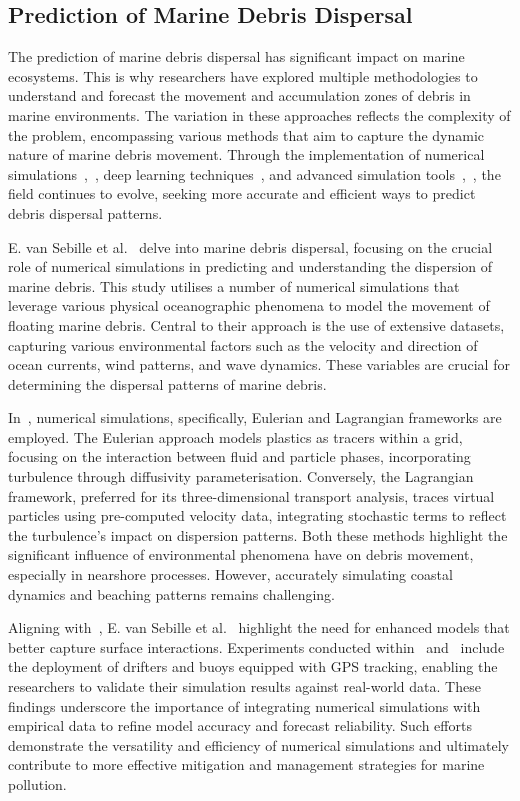 \subsection{Prediction of Marine Debris Dispersal}
\label{subsec:2.2.1}
The prediction of marine debris dispersal has significant impact on marine ecosystems. This is why researchers have explored multiple methodologies to understand and forecast the movement and accumulation zones of debris in marine environments. The variation in these approaches reflects the complexity of the problem, encompassing various methods that aim to capture the dynamic nature of marine debris movement. Through the implementation of numerical simulations~\cite{34},~\cite{35}, deep learning techniques~\cite{36}, and advanced simulation tools~\cite{37},~\cite{38}, the field continues to evolve, seeking more accurate and efficient ways to predict debris dispersal patterns. 

E. van Sebille et al.~\cite{34} delve into marine debris dispersal, focusing on the crucial role of numerical simulations in predicting and understanding the dispersion of marine debris. This study utilises a number of numerical simulations that leverage various physical oceanographic phenomena to model the movement of floating marine debris. Central to their approach is the use of extensive datasets, capturing various environmental factors such as the velocity and direction of ocean currents, wind patterns, and wave dynamics. These variables are crucial for determining the dispersal patterns of marine debris.

In~\cite{34}, numerical simulations, specifically, Eulerian and Lagrangian frameworks are employed. The Eulerian approach models plastics as tracers within a grid, focusing on the interaction between fluid and particle phases, incorporating turbulence through diffusivity parameterisation. Conversely, the Lagrangian framework, preferred for its three-dimensional transport analysis, traces virtual particles using pre-computed velocity data, integrating stochastic terms to reflect the turbulence's impact on dispersion patterns.  Both these methods highlight the significant influence of environmental phenomena have on debris movement, especially in nearshore processes. However, accurately simulating coastal dynamics and beaching patterns remains challenging.

Aligning with~\cite{35}, E. van Sebille et al.~\cite{34} highlight the need for enhanced models that better capture surface interactions. Experiments conducted within~\cite{34} and~\cite{35} include the deployment of drifters and buoys equipped with GPS tracking, enabling the researchers to validate their simulation results against real-world data. These findings underscore the importance of integrating numerical simulations with empirical data to refine model accuracy and forecast reliability. Such efforts demonstrate the versatility and efficiency of numerical simulations and ultimately contribute to more effective mitigation and management strategies for marine pollution.\newline

